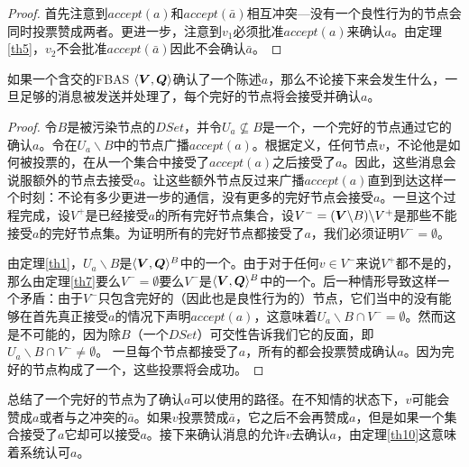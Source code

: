 \begin{proof}
	首先注意到$accept(a)$和$accept(\bar a)$相互冲突---没有一个良性行为的节点会同时投票赞成两者。更进一步，注意到$v_1$必须批准$accept(a)$来确认$a$。由定理\ref{th5}，$v_2$不会批准$accept(\bar a)$因此不会确认$\bar a$。
\end{proof}

\begin{theorem}\label{th10}
	如果一个含{\quorum}交的FBAS $\langle{\bm V},{\bm Q}\rangle$确认了一个陈述$a$，那么不论接下来会发生什么，一旦足够的消息被发送并处理了，每个完好的节点将会接受并确认$a$。
\end{theorem}

\begin{proof}
	令$B$是被污染节点的$DSet$，并令$U_a\not \subseteq B$是一个{\quorum}，一个完好的节点通过它的确认$a$。令在$U_a\backslash B$中的节点广播$accept(a)$。根据定义，任何节点$v$，不论他是如何被投票的，在从一个{\vblock}集合中接受了$accept(a)$之后接受了$a$。因此，这些消息会说服额外的节点去接受$a$。让这些额外节点反过来广播$accept(a)$直到到达这样一个时刻：不论有多少更进一步的通信，没有更多的完好节点会接受$a$。一旦这个过程完成，设$V^+$是已经接受$a$的所有完好节点集合，设$V^-=({\bm V}\backslash B)\backslash V^+$是那些不能接受$a$的完好节点集。为证明所有的完好节点都接受了$a$，我们必须证明$V^-=\emptyset$。

	由定理\ref{th1}，$U_a\backslash B$是$\langle{\bm V},{\bm Q}\rangle^{B}$中的一个{\quorum}。由于对于任何$v\in V^-$来说$V^+$都不是{\vblock}的，那么由定理\ref{th7}要么$V^-=\emptyset$要么$V^-$是$\langle{\bm V},{\bm Q}\rangle^{B}$中的一个{\quorum}。后一种情形导致这样一个矛盾：由于$V^-$只包含完好的（因此也是良性行为的）节点，它们当中的没有能够在首先真正接受$a$的情况下声明$accept(a)$，这意味着$U_a\backslash B\cap V^-=\emptyset$。然而这是不可能的，因为除$B$（一个$DSet$）{\quorum}可交性告诉我们它的反面，即$U_a\backslash B\cap V^-\neq\emptyset$。	一旦每个节点都接受了$a$，所有的都会投票赞成确认$a$。因为完好的节点构成了一个{\quorum}，这些投票将会成功。
\end{proof}

总结了一个完好的节点为了确认$a$可以使用的路径。在不知情的状态下，$v$可能会赞成$a$或者与之冲突的$\bar a$。如果$v$投票赞成$\bar a$，它之后不会再赞成$a$，但是如果一个{\vblock}集合接受了$a$它却可以接受$a$。接下来确认消息的{\quorum}允许$v$去确认$a$，由定理\ref{th10}这意味着系统认可$a$。